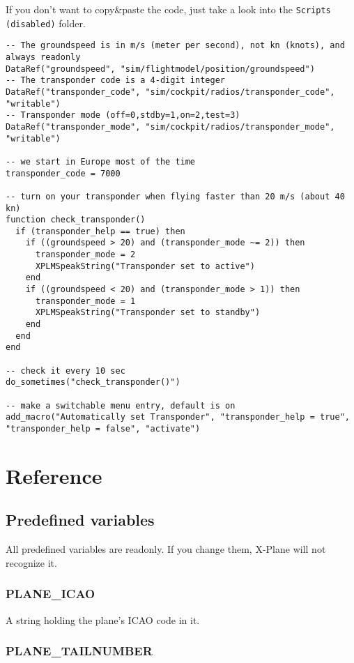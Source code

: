 \documentclass[11pt,parskip=half,a4paper]{scrartcl}
\begin{document}
If you don't want to copy\&paste the code, just take a look into the \verb|Scripts (disabled)| folder.

\begin{lstlisting}
-- The groundspeed is in m/s (meter per second), not kn (knots), and always readonly
DataRef("groundspeed", "sim/flightmodel/position/groundspeed")
-- The transponder code is a 4-digit integer
DataRef("transponder_code", "sim/cockpit/radios/transponder_code", "writable")
-- Transponder mode (off=0,stdby=1,on=2,test=3)
DataRef("transponder_mode", "sim/cockpit/radios/transponder_mode", "writable")

-- we start in Europe most of the time
transponder_code = 7000

-- turn on your transponder when flying faster than 20 m/s (about 40 kn)
function check_transponder()
  if (transponder_help == true) then
    if ((groundspeed > 20) and (transponder_mode ~= 2)) then
      transponder_mode = 2
      XPLMSpeakString("Transponder set to active")
    end
    if ((groundspeed < 20) and (transponder_mode > 1)) then
      transponder_mode = 1
      XPLMSpeakString("Transponder set to standby")
    end
  end
end

-- check it every 10 sec
do_sometimes("check_transponder()")

-- make a switchable menu entry, default is on
add_macro("Automatically set Transponder", "transponder_help = true", "transponder_help = false", "activate")
\end{lstlisting}

\newpage
\section{Reference}
\subsection{Predefined variables}

All predefined variables are readonly. If you change them, X-Plane will not recognize it.

\subsubsection{PLANE\_ICAO}

A string holding the plane's ICAO code in it.

\subsubsection{PLANE\_TAILNUMBER}
\end{document}
